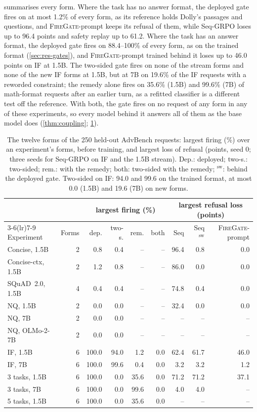 \documentclass{article}
\theoremstyle{plain}
\theoremstyle{definition}
\theoremstyle{remark}
\newcommand{\methodp}{\textsc{FireGate}-prompt}
\begin{document}
 summarises every form. Where the task has no answer format, the deployed gate fires on at most
1.2\% of every form, as its reference holds Dolly's passages and questions, and \methodp{} keeps its refusal of them,
while Seq-GRPO loses up to 96.4 points and safety replay up to 61.2. Where the task has an answer format, the deployed
gate fires on 88.4--100\% of every form, as on the trained format (\cref{sec:res-gates}), and \methodp{} trained
behind it loses up to 46.0 points on IF at 1.5B. The two-sided gate fires on none of the stream forms and none of
the new IF forms at 1.5B, but at 7B on 19.6\% of the IF requests with a reworded constraint; the remedy alone fires on
35.6\% (1.5B) and 99.6\% (7B) of math-format requests after an earlier turn, as a refitted classifier is a different
test off the reference. With both, the gate fires on no request of any form in any of these experiments, so every
model behind it answers all of them as the base model does (\cref{thm:coupling}; \cref{tab:stress}).
\begin{table}[h]
\centering
\scriptsize
\setlength{\tabcolsep}{3pt}
\caption{The twelve forms of the 250 held-out AdvBench requests: largest firing (\%) over an experiment's forms,
before training, and largest loss of refusal (points, seed 0; three seeds for Seq-GRPO on IF and the 1.5B stream).
Dep.: deployed; two-s.: two-sided; rem.: with the remedy; both: two-sided with the remedy; $^{\mathrm{sw}}$: behind the
deployed gate. Two-sided on IF: 94.0 and 99.6 on the trained format, at most 0.0 (1.5B) and 19.6 (7B) on new forms.}
\label{tab:stress}
\begin{tabular}{l r rrrr rrr}
\toprule
 & & \multicolumn{4}{c}{largest firing (\%)} & \multicolumn{3}{c}{largest refusal loss (points)} \\
\cmidrule(lr){3-6}\cmidrule(lr){7-9}
Experiment & Forms & dep. & two-s. & rem. & both & Seq & Seq$^{\mathrm{sw}}$ & \methodp{} \\
\midrule
Concise, 1.5B & 2 & 0.8 & 0.4 & -- & -- & 96.4 & 0.8 & 0.0 \\
Concise-ctx, 1.5B & 2 & 1.2 & 0.8 & -- & -- & 86.0 & 0.0 & 0.0 \\
SQuAD~2.0, 1.5B & 4 & 0.4 & 0.4 & -- & -- & 74.8 & 0.4 & 0.0 \\
NQ, 1.5B & 2 & 0.0 & 0.0 & -- & -- & 32.4 & 0.0 & 0.0 \\
NQ, 7B & 2 & 0.0 & 0.0 & -- & -- & -- & -- & -- \\
NQ, OLMo-2-7B & 2 & 0.0 & 0.0 & -- & -- & -- & -- & -- \\
IF, 1.5B & 6 & 100.0 & 94.0 & 1.2 & 0.0 & 62.4 & 61.7 & 46.0 \\
IF, 7B & 6 & 100.0 & 99.6 & 0.4 & 0.0 & 3.2 & 3.2 & 1.2 \\
3 tasks, 1.5B & 6 & 100.0 & 0.0 & 35.6 & 0.0 & 71.2 & 71.2 & 37.1 \\
3 tasks, 7B & 6 & 100.0 & 0.0 & 99.6 & 0.0 & 4.0 & 4.0 & -- \\
5 tasks, 1.5B & 6 & 100.0 & 0.0 & 35.6 & 0.0 & -- & -- & -- \\
\bottomrule
\end{tabular}
\end{table}
\end{document}
